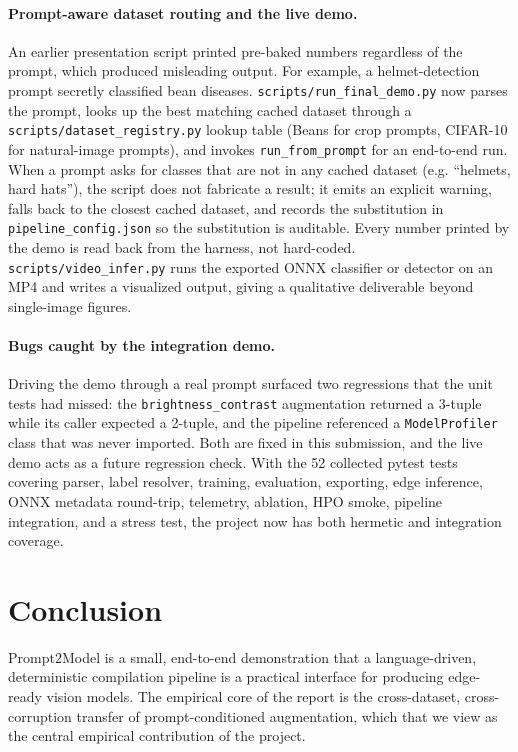 \documentclass[10pt,twocolumn,letterpaper]{article}
\begin{document}
\paragraph{Prompt-aware dataset routing and the live demo.}
An earlier presentation script printed pre-baked numbers regardless
of the prompt, which produced misleading output. For example, a
helmet-detection prompt secretly classified bean diseases.
\texttt{scripts/run\_final\_demo.py} now parses the prompt, looks up
the best matching cached dataset through a
\texttt{scripts/dataset\_registry.py} lookup table (Beans for crop
prompts, CIFAR-10 for natural-image prompts), and invokes
\texttt{run\_from\_prompt} for an end-to-end run. When a prompt asks
for classes that are not in any cached dataset (e.g. ``helmets, hard
hats''), the script does not fabricate a result; it emits an explicit
warning, falls back to the closest cached dataset, and records the
substitution in \texttt{pipeline\_config.json} so the substitution is
auditable. Every number printed by the demo is read back from the
harness, not hard-coded. \texttt{scripts/video\_infer.py} runs the
exported ONNX classifier or detector on an MP4 and writes a
visualized output, giving a qualitative deliverable beyond
single-image figures.

\paragraph{Bugs caught by the integration demo.}
Driving the demo through a real prompt surfaced two regressions that
the unit tests had missed: the \texttt{brightness\_contrast}
augmentation returned a 3-tuple while its caller expected a 2-tuple,
and the pipeline referenced a \texttt{ModelProfiler} class that was
never imported. Both are fixed in this submission, and the live demo
acts as a future regression check. With the 52 collected pytest tests
covering parser, label resolver, training, evaluation, exporting,
edge inference, ONNX metadata round-trip, telemetry, ablation, HPO
smoke, pipeline integration, and a stress test, the project now has
both hermetic and integration coverage.

\section{Conclusion}
Prompt2Model is a small, end-to-end demonstration that a
language-driven, deterministic compilation pipeline is a practical interface for producing edge-ready vision models. The empirical
core of the report is the cross-dataset, cross-corruption transfer
of prompt-conditioned augmentation, which that we view as the central empirical contribution of the project.
\end{document}
